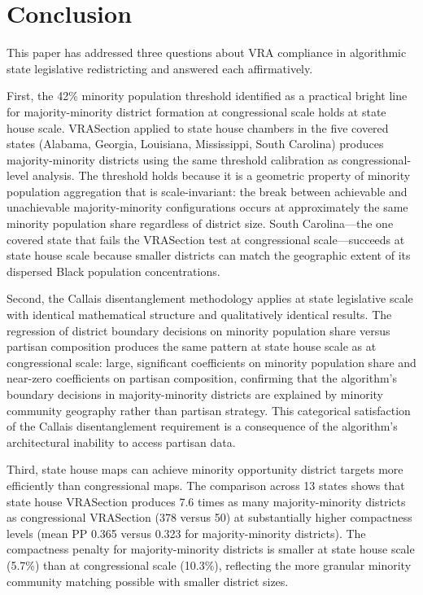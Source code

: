 \section{Conclusion}
\label{sec:conclusion}

This paper has addressed three questions about VRA compliance in algorithmic state legislative redistricting and answered each affirmatively.

First, the 42\% minority population threshold identified as a practical bright line for majority-minority district formation at congressional scale holds at state house scale. VRASection applied to state house chambers in the five covered states (Alabama, Georgia, Louisiana, Mississippi, South Carolina) produces majority-minority districts using the same threshold calibration as congressional-level analysis. The threshold holds because it is a geometric property of minority population aggregation that is scale-invariant: the break between achievable and unachievable majority-minority configurations occurs at approximately the same minority population share regardless of district size. South Carolina---the one covered state that fails the VRASection test at congressional scale---succeeds at state house scale because smaller districts can match the geographic extent of its dispersed Black population concentrations.

Second, the Callais disentanglement methodology applies at state legislative scale with identical mathematical structure and qualitatively identical results. The regression of district boundary decisions on minority population share versus partisan composition produces the same pattern at state house scale as at congressional scale: large, significant coefficients on minority population share and near-zero coefficients on partisan composition, confirming that the algorithm's boundary decisions in majority-minority districts are explained by minority community geography rather than partisan strategy. This categorical satisfaction of the Callais disentanglement requirement is a consequence of the algorithm's architectural inability to access partisan data.

Third, state house maps can achieve minority opportunity district targets more efficiently than congressional maps. The comparison across 13 states shows that state house VRASection produces 7.6 times as many majority-minority districts as congressional VRASection (378 versus 50) at substantially higher compactness levels (mean PP 0.365 versus 0.323 for majority-minority districts). The compactness penalty for majority-minority districts is smaller at state house scale (5.7\%) than at congressional scale (10.3\%), reflecting the more granular minority community matching possible with smaller district sizes.

